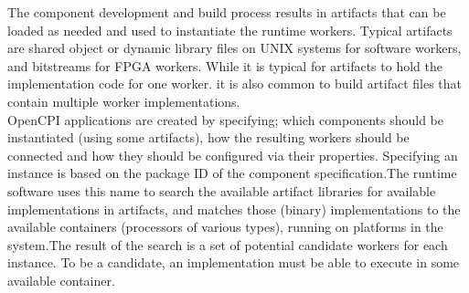 \documentclass[10pt, a4paper, oneside]{article}
\renewcommand\_{\textunderscore\allowbreak} %
\begin{document}
The component development and build process results in artifacts that can be loaded as needed and used to instantiate the runtime workers. Typical artifacts are shared object or dynamic library files on UNIX systems for software workers, and bitstreams for FPGA workers. While it is typical for artifacts to hold the implementation code for one worker. it is also common to build artifact files that contain multiple worker implementations.\\

OpenCPI applications are created by specifying; which components should be instantiated (using some artifacts), how the resulting workers should be connected and how they should be configured via their properties. Specifying an instance is based on the package ID of the component specification.The runtime software uses this name to search the available artifact libraries for available implementations  in artifacts, and matches those (binary) implementations to the available containers (processors of various types), running on platforms in the system.The result of the search is a set of potential candidate workers for each instance. To be a candidate, an implementation must be able to execute in some available container.\\
\end{document}
